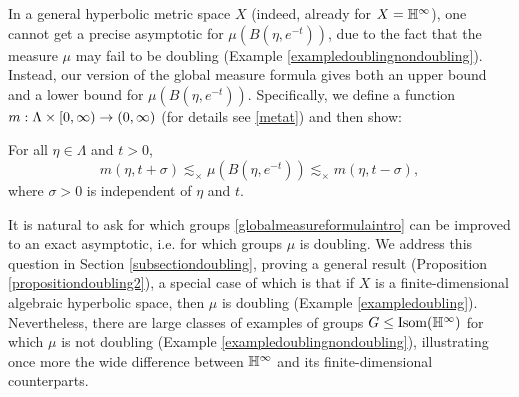 In a general hyperbolic metric space $X$ (indeed, already for $X = \H^\infty$), one cannot get a precise asymptotic for $\mu(B(\eta,e^{-t}))$, due to the fact that the measure $\mu$ may fail to be doubling (Example \ref{exampledoublingnondoubling}). Instead, our version of the global measure formula gives both an upper bound and a lower bound for $\mu(B(\eta,e^{-t}))$. Specifically, we define a function $m:\Lambda\times{[0,\infty)}\to(0,\infty)$ (for details see \eqref{metat}) and then show:
\begin{theorem}
\label{theoremglobalmeasureintro}
For all $\eta\in\Lambda$ and $t > 0$,
\begin{equation}
\label{globalmeasureformulaintro}
m(\eta,t + \sigma) \lesssim_\times \mu(B(\eta,e^{-t})) \lesssim_\times m(\eta,t - \sigma),
\end{equation}
where $\sigma > 0$ is independent of $\eta$ and $t$.
\end{theorem}

It is natural to ask for which groups \eqref{globalmeasureformulaintro} can be improved to an exact asymptotic, i.e. for which groups $\mu$ is doubling. We address this question in Section \ref{subsectiondoubling}, proving a general result (Proposition \ref{propositiondoubling2}), a special case of which is that if $X$ is a finite-dimensional algebraic hyperbolic space, then $\mu$ is doubling (Example \ref{exampledoubling}). Nevertheless, there are large classes of examples of groups $G\leq\Isom(\H^\infty)$ for which $\mu$ is not doubling (Example \ref{exampledoublingnondoubling}), illustrating once more the wide difference between $\H^\infty$ and its finite-dimensional counterparts.

